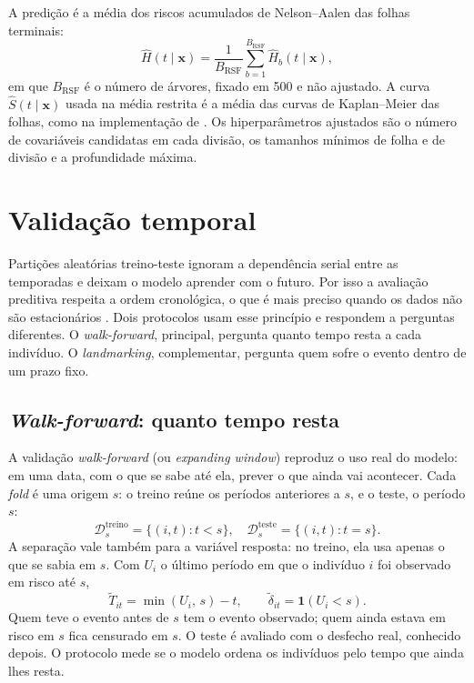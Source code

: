 A predição é a média dos riscos acumulados de Nelson--Aalen das folhas terminais:
\begin{equation}
  \hat{H}(t \mid \mathbf{x}) = \frac{1}{B_{\mathrm{RSF}}} \sum_{b=1}^{B_{\mathrm{RSF}}} \hat{H}_b(t \mid \mathbf{x}),
  \label{eq:rsf}
\end{equation}
em que $B_{\mathrm{RSF}}$ é o número de árvores, fixado em 500 e não ajustado. A curva $\hat S(t \mid \mathbf{x})$ usada na média restrita é a média das curvas de Kaplan--Meier das folhas, como na implementação de \citet{polsterl2020}. Os hiperparâmetros ajustados são o número de covariáveis candidatas em cada divisão, os tamanhos mínimos de folha e de divisão e a profundidade máxima.

\section{Validação temporal}
\label{sec:validacao_temporal}

Partições aleatórias treino-teste ignoram a dependência serial entre as temporadas e deixam o modelo aprender com o futuro. Por isso a avaliação preditiva respeita a ordem cronológica, o que é mais preciso quando os dados não são estacionários \citep{cerqueira2020}. Dois protocolos usam esse princípio e respondem a perguntas diferentes. O \textit{walk-forward}, principal, pergunta quanto tempo resta a cada indivíduo. O \textit{landmarking}, complementar, pergunta quem sofre o evento dentro de um prazo fixo.

    \subsection{\textit{Walk-forward}: quanto tempo resta}
    \label{subsec:walkforward}

A validação \textit{walk-forward} (ou \textit{expanding window}) reproduz o uso real do modelo: em uma data, com o que se sabe até ela, prever o que ainda vai acontecer. Cada \textit{fold} é uma origem $s$: o treino reúne os períodos anteriores a $s$, e o teste, o período $s$:
\begin{equation}
  \mathcal{D}_s^{\text{treino}} = \{(i, t) : t < s\}, \quad
  \mathcal{D}_s^{\text{teste}} = \{(i, t) : t = s\}.
  \label{eq:walkforward}
\end{equation}
A separação vale também para a variável resposta: no treino, ela usa apenas o que se sabia em $s$. Com $U_i$ o último período em que o indivíduo $i$ foi observado em risco até $s$,
\begin{equation}
  \tilde{T}_{it} = \min(U_i,\, s) - t,
  \qquad
  \tilde{\delta}_{it} = \mathbf{1}(U_i < s).
  \label{eq:resposta_origem}
\end{equation}
Quem teve o evento antes de $s$ tem o evento observado; quem ainda estava em risco em $s$ fica censurado em $s$. O teste é avaliado com o desfecho real, conhecido depois. O protocolo mede se o modelo ordena os indivíduos pelo tempo que ainda lhes resta.

